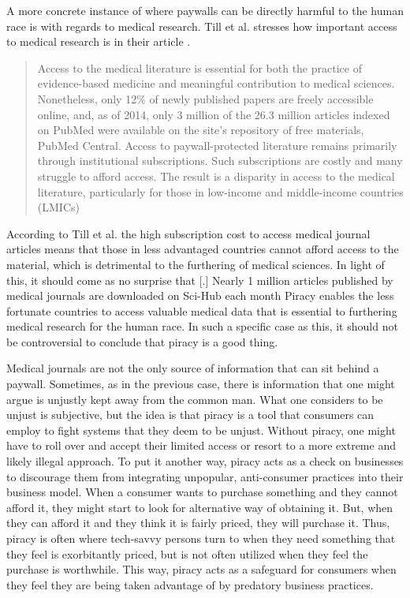 \documentclass[onecolumn, 12pt]{article}
\begin{document}
\begin{refsection}
A more concrete instance of where paywalls can be directly harmful to the human race is
with regards to medical research. Till et al. stresses how important access to medical
research is in their article .
\blockcquote{till:medical-literature}[.]{%
  Access to the medical literature is essential for both the practice of
  evidence-based medicine and meaningful contribution to medical sciences.
  Nonetheless, only 12\% of newly published papers are freely accessible online,
  and, as of 2014, only 3 million of the 26.3 million articles indexed on PubMed
  were available on the site's repository of free materials, PubMed Central.
  Access to paywall-protected literature remains primarily through institutional
  subscriptions. Such subscriptions are costly and many struggle to afford
  access. The result is a disparity in access to the medical literature,
  particularly for those in low-income and middle-income countries (LMICs)%
}
According to Till et al. the high subscription cost to access medical journal articles
means that those in less advantaged countries cannot afford access to the material, which
is detrimental to the furthering of medical sciences. In light of this, it should come as
no surprise that [.]{
  Nearly 1 million articles published by medical journals are downloaded on
  Sci-Hub each month%
} Piracy enables the less fortunate countries to access valuable medical data that is
essential to furthering medical research for the human race. In such a specific case as
this, it should not be controversial to conclude that piracy is a good thing.

Medical journals are not the only source of information that can sit behind a paywall.
Sometimes, as in the previous case, there is information that one might argue is unjustly
kept away from the common man. What one considers to be unjust is subjective, but the idea
is that piracy is a tool that consumers can employ to fight systems that they deem to be
unjust. Without piracy, one might have to roll over and accept their limited access or
resort to a more extreme and likely illegal approach. To put it another way, piracy acts
as a check on businesses to discourage them from integrating unpopular, anti-consumer
practices into their business model. When a consumer wants to purchase something and they
cannot afford it, they might start to look for alternative way of obtaining it. But, when
they can afford it and they think it is fairly priced, they will purchase it. Thus, piracy
is often where tech-savvy persons turn to when they need something that they feel is
exorbitantly priced, but is not often utilized when they feel the purchase is worthwhile.
This way, piracy acts as a safeguard for consumers when they feel they are being taken
advantage of by predatory business practices.


\end{refsection}
\end{document}
